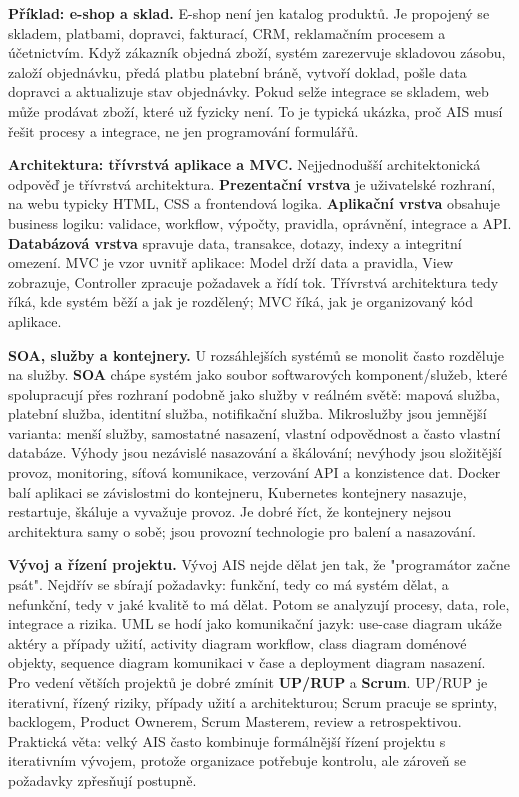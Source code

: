 \documentclass[11pt,a4paper]{article}
\begin{document}
\begin{greenbox}
\textbf{Příklad: e-shop a sklad.} E-shop není jen katalog produktů. Je propojený se skladem, platbami, dopravci, fakturací, CRM, reklamačním procesem a účetnictvím. Když zákazník objedná zboží, systém zarezervuje skladovou zásobu, založí objednávku, předá platbu platební bráně, vytvoří doklad, pošle data dopravci a aktualizuje stav objednávky. Pokud selže integrace se skladem, web může prodávat zboží, které už fyzicky není. To je typická ukázka, proč AIS musí řešit procesy a integrace, ne jen programování formulářů.

\textbf{Architektura: třívrstvá aplikace a MVC.} Nejjednodušší architektonická odpověď je třívrstvá architektura. \textbf{Prezentační vrstva} je uživatelské rozhraní, na webu typicky HTML, CSS a frontendová logika. \textbf{Aplikační vrstva} obsahuje business logiku: validace, workflow, výpočty, pravidla, oprávnění, integrace a API. \textbf{Databázová vrstva} spravuje data, transakce, dotazy, indexy a integritní omezení. MVC je vzor uvnitř aplikace: Model drží data a pravidla, View zobrazuje, Controller zpracuje požadavek a řídí tok. Třívrstvá architektura tedy říká, kde systém běží a jak je rozdělený; MVC říká, jak je organizovaný kód aplikace.

\textbf{SOA, služby a kontejnery.} U rozsáhlejších systémů se monolit často rozděluje na služby. \textbf{SOA} chápe systém jako soubor softwarových komponent/služeb, které spolupracují přes rozhraní podobně jako služby v reálném světě: mapová služba, platební služba, identitní služba, notifikační služba. Mikroslužby jsou jemnější varianta: menší služby, samostatné nasazení, vlastní odpovědnost a často vlastní databáze. Výhody jsou nezávislé nasazování a škálování; nevýhody jsou složitější provoz, monitoring, síťová komunikace, verzování API a konzistence dat. Docker balí aplikaci se závislostmi do kontejneru, Kubernetes kontejnery nasazuje, restartuje, škáluje a vyvažuje provoz. Je dobré říct, že kontejnery nejsou architektura samy o sobě; jsou provozní technologie pro balení a nasazování.

\textbf{Vývoj a řízení projektu.} Vývoj AIS nejde dělat jen tak, že "programátor začne psát". Nejdřív se sbírají požadavky: funkční, tedy co má systém dělat, a nefunkční, tedy v jaké kvalitě to má dělat. Potom se analyzují procesy, data, role, integrace a rizika. UML se hodí jako komunikační jazyk: use-case diagram ukáže aktéry a případy užití, activity diagram workflow, class diagram doménové objekty, sequence diagram komunikaci v čase a deployment diagram nasazení. Pro vedení větších projektů je dobré zmínit \textbf{UP/RUP} a \textbf{Scrum}. UP/RUP je iterativní, řízený riziky, případy užití a architekturou; Scrum pracuje se sprinty, backlogem, Product Ownerem, Scrum Masterem, review a retrospektivou. Praktická věta: velký AIS často kombinuje formálnější řízení projektu s iterativním vývojem, protože organizace potřebuje kontrolu, ale zároveň se požadavky zpřesňují postupně.


\end{greenbox}
\end{document}
